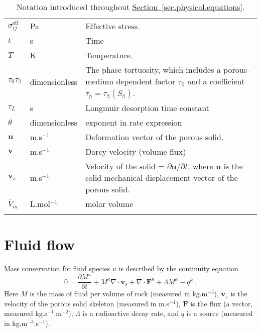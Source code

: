 \documentclass[12pt]{report}
\def\species{\kappa}
\def\phase{\mathrm{\beta}}
\def\flux{\mathbf{F}}
\def\darcyvel{\mathbf{v}}
\begin{document}
\begin{longtable}{llp{10cm}}
$\sigma^{\mathrm{eff}}_{ij}$ & Pa & Effective stress. \\

$t$ & s & Time \\

$T$ & K & Temperature. \\

$\tau_{0}\tau_{\phase}$ & dimensionless & The phase tortuosity, which
includes a porous-medium dependent factor $\tau_{0}$ and a coefficient
$\tau_{\phase}=\tau_{\phase}(S_{\phase})$. \\

$\tau_{L}$ & s & Langmuir desorption time constant \\

$\theta$ & dimensionless & exponent in rate expression \\

${\mathbf{u}}$ & m.s$^{-1}$ & Deformation vector of the porous solid. \\

$\darcyvel$ & m.s$^{-1}$ & Darcy velocity (volume flux) \\

${\mathbf v}_{s}$ & m.s$^{-1}$ & Velocity of the solid = $\partial
{\mathbf u}/\partial t$, where ${\mathbf u}$ is the solid mechanical
displacement vector of the porous solid. \\

$\overline{V}_{m}$ & L.mol$^{-1}$ & molar volume \\
\hline
\caption{Notation introduced throughout
  \hyperref[sec.physical.equations]{Section~\ref*{sec.physical.equations}}.}
\label{table.notation}
\end{longtable}


\section{Fluid flow}

Mass conservation for fluid species $\species$ is described by the continuity
equation
\begin{equation}
0 = \frac{\partial M^{\species}}{\partial t} + M^{\species}\nabla\cdot{\mathbf
  v}_{s} + \nabla\cdot \flux^{\species} + \Lambda M^{\species} - q^{\species} \ .
\label{mass.cons.sp.eqn}
\end{equation}
Here $M$ is the mass of fluid per volume of rock (measured in
kg.m$^{-3}$), ${\mathbf v}_{s}$ is the velocity of the porous solid
skeleton (measured in m.s$^{-1}$), $\flux$ is the flux (a vector,
measured kg.s$^{-1}$.m$^{-2}$), $\Lambda$ is a radioactive decay rate,
and $q$ is a source (measured in kg.m$^{-3}$.s$^{-1}$).
\end{document}

